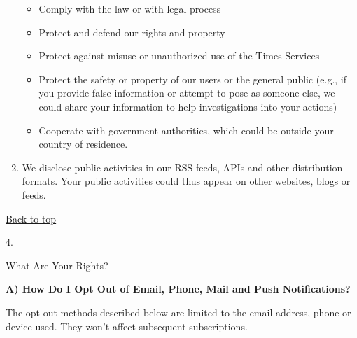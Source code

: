 \begin{enumerate}
  \begin{itemize}
  \tightlist
  \item
    Comply with the law or with legal process
  \item
    Protect and defend our rights and property
  \item
    Protect against misuse or unauthorized use of the Times Services
  \item
    Protect the safety or property of our users or the general public
    (e.g., if you provide false information or attempt to pose as
    someone else, we could share your information to help investigations
    into your actions)
  \item
    Cooperate with government authorities, which could be outside your
    country of residence.
  \end{itemize}
\item
  We disclose public activities in our RSS feeds, APIs and other
  distribution formats. Your public activities could thus appear on
  other websites, blogs or feeds.
\end{enumerate}

\href{app}{Back to top}

4.

What Are Your Rights?

\textbf{A) How Do I Opt Out of Email, Phone, Mail and Push
Notifications?}

The opt-out methods described below are limited to the email address,
phone or device used. They won't affect subsequent subscriptions.

